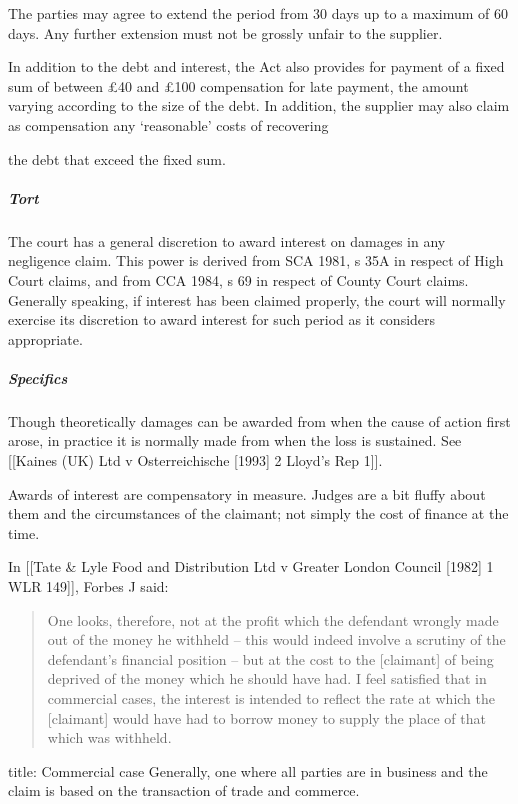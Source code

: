 \documentclass[
]{article}
\newenvironment{Shaded}{}{}
\newcommand{\NormalTok}[1]{#1}
\begin{document}
The parties may agree to extend the period from 30 days up to a maximum
of 60 days. Any further extension must not be grossly unfair to the
supplier.

In addition to the debt and interest, the Act also provides for payment
of a fixed sum of between £40 and £100 compensation for late payment,
the amount varying according to the size of the debt. In addition, the
supplier may also claim as compensation any `reasonable' costs of
recovering

the debt that exceed the fixed sum.

\hypertarget{tort-1}{%
\subparagraph{Tort}\label{tort-1}}

The court has a general discretion to award interest on damages in any
negligence claim. This power is derived from SCA 1981, s 35A in respect
of High Court claims, and from CCA 1984, s 69 in respect of County Court
claims. Generally speaking, if interest has been claimed properly, the
court will normally exercise its discretion to award interest for such
period as it considers appropriate.

\hypertarget{specifics}{%
\subparagraph{Specifics}\label{specifics}}

Though theoretically damages can be awarded from when the cause of
action first arose, in practice it is normally made from when the loss
is sustained. See {[}{[}Kaines (UK) Ltd v Osterreichische {[}1993{]} 2
Lloyd's Rep 1{]}{]}.

Awards of interest are compensatory in measure. Judges are a bit fluffy
about them and the circumstances of the claimant; not simply the cost of
finance at the time.

In {[}{[}Tate \& Lyle Food and Distribution Ltd v Greater London Council
{[}1982{]} 1 WLR 149{]}{]}, Forbes J said:

\begin{quote}
One looks, therefore, not at the profit which the defendant wrongly made
out of the money he withheld -- this would indeed involve a scrutiny of
the defendant's financial position -- but at the cost to the
{[}claimant{]} of being deprived of the money which he should have had.
I feel satisfied that in commercial cases, the interest is intended to
reflect the rate at which the {[}claimant{]} would have had to borrow
money to supply the place of that which was withheld.
\end{quote}

\begin{Shaded}
\begin{Highlighting}[]
\NormalTok{title: Commercial case}
\NormalTok{Generally, one where all parties are in business and the claim is based on the transaction of trade and commerce. }
\end{Highlighting}
\end{Shaded}
\end{document}
